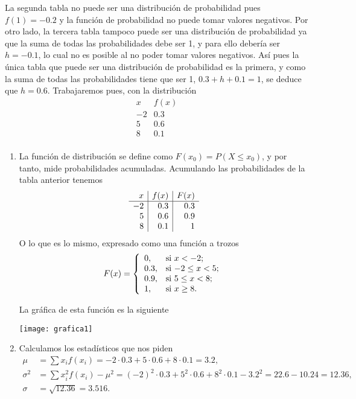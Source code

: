 {La segunda tabla no puede ser una distribución de probabilidad pues $f(1)=-0.2$ y la función de probabilidad no puede tomar valores
negativos. Por otro lado, la tercera tabla tampoco puede ser una distribución de probabilidad ya que la suma de todas las probabilidades
debe ser 1, y para ello debería ser $h=-0.1$, lo cual no es posible al no poder tomar valores negativos. Así pues la única tabla que puede
ser una distribución de probabilidad es la primera, y como la suma de todas las probabilidades tiene que ser 1, $0.3+h+0.1=1$, se deduce que
$h=0.6$. Trabajaremos pues, con la distribución
\[
\begin{array}{r|r}
 x  & f(x) \\
\hline
 -2 & 0.3  \\
 5  & 0.6  \\
 8  & 0.1  \\
\end{array}
\]

\begin{enumerate}
\item La función de distribución se define como $F(x_0)=P(X\leq x_0)$, y por tanto,  mide probabilidades acumuladas. Acumulando las
probabilidades de la tabla anterior tenemos
\[
\begin{array}{r|r|r}
 x  & \multicolumn{1}{c|}{f(x)} & \multicolumn{1}{c}{F(x)}\\
\hline
 -2 & 0.3 & 0.3 \\
 5  & 0.6 & 0.9 \\
 8  & 0.1 & 1 \\
\end{array}
\]
O lo que es lo mismo, expresado como una función a trozos
\[
F(x)=
\left\{%
\begin{array}{ll}
   0, & \hbox{si $x<-2$;} \\
   0.3, & \hbox{si $-2\leq x<5$;} \\
   0.9, & \hbox{si $5\leq x<8$;} \\
   1, & \hbox{si $x\geq 8$.} \\
\end{array}%
\right.
\]

La gráfica de esta función es la siguiente
\begin{center}
\texttt{[image: grafica1]}\hspace*{1cm}
\end{center}

\item Calculamos los estadísticos que nos piden
\begin{align*}
\mu &= \sum x_if(x_i)=-2\cdot0.3+5\cdot 0.6+8\cdot 0.1=3.2,\\
\sigma^2 &= \sum x_i^2f(x_i)-\mu^2=(-2)^2\cdot 0.3+5^2\cdot 0.6+8^2\cdot 0.1-3.2^2=22.6-10.24=12.36,\\
\sigma &= \sqrt{12.36}=3.516.
\end{align*}


\end{enumerate}}
